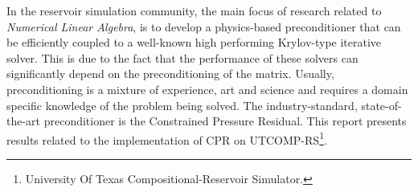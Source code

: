 %
%

In the reservoir simulation community, the main focus of research related to \textit{Numerical Linear Algebra}, 
is to develop a physics-based preconditioner that can be efficiently coupled to a well-known high
performing Krylov-type iterative solver. This is due to the fact that the performance of these
solvers can significantly depend on the preconditioning of the matrix. Usually, preconditioning
is a mixture of experience, art and science and requires a domain specific knowledge of the problem
being solved. The industry-standard, state-of-the-art preconditioner is the Constrained Pressure Residual.
This report presents results related to the implementation of CPR on UTCOMP-RS\footnote{University Of Texas Compositional-Reservoir Simulator.}.
